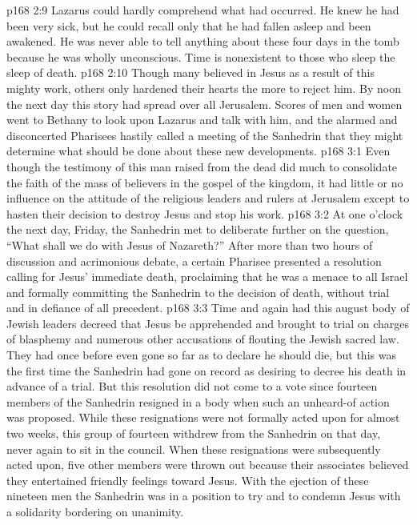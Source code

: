 \pc \vs p168 2:9 Lazarus could hardly comprehend what had occurred. He knew he had been very sick, but he could recall only that he had fallen asleep and been awakened. He was never able to tell anything about these four days in the tomb because he was wholly unconscious. Time is nonexistent to those who sleep the sleep of death.
\vs p168 2:10 Though many believed in Jesus as a result of this mighty work, others only hardened their hearts the more to reject him. By noon the next day this story had spread over all Jerusalem. Scores of men and women went to Bethany to look upon Lazarus and talk with him, and the alarmed and disconcerted Pharisees hastily called a meeting of the Sanhedrin that they might determine what should be done about these new developments.
\vs p168 3:1 Even though the testimony of this man raised from the dead did much to consolidate the faith of the mass of believers in the gospel of the kingdom, it had little or no influence on the attitude of the religious leaders and rulers at Jerusalem except to hasten their decision to destroy Jesus and stop his work.
\pc \vs p168 3:2 At one o’clock the next day, Friday, the Sanhedrin met to deliberate further on the question, “What shall we do with Jesus of Nazareth?” After more than two hours of discussion and acrimonious debate, a certain Pharisee presented a resolution calling for Jesus’ immediate death, proclaiming that he was a menace to all Israel and formally committing the Sanhedrin to the decision of death, without trial and in defiance of all precedent.
\vs p168 3:3 Time and again had this august body of Jewish leaders decreed that Jesus be apprehended and brought to trial on charges of blasphemy and numerous other accusations of flouting the Jewish sacred law. They had once before even gone so far as to declare he should die, but this was the first time the Sanhedrin had gone on record as desiring to decree his death in advance of a trial. But this resolution did not come to a vote since fourteen members of the Sanhedrin resigned in a body when such an unheard\hyp{}of action was proposed. While these resignations were not formally acted upon for almost two weeks, this group of fourteen withdrew from the Sanhedrin on that day, never again to sit in the council. When these resignations were subsequently acted upon, five other members were thrown out because their associates believed they entertained friendly feelings toward Jesus. With the ejection of these nineteen men the Sanhedrin was in a position to try and to condemn Jesus with a solidarity bordering on unanimity.
